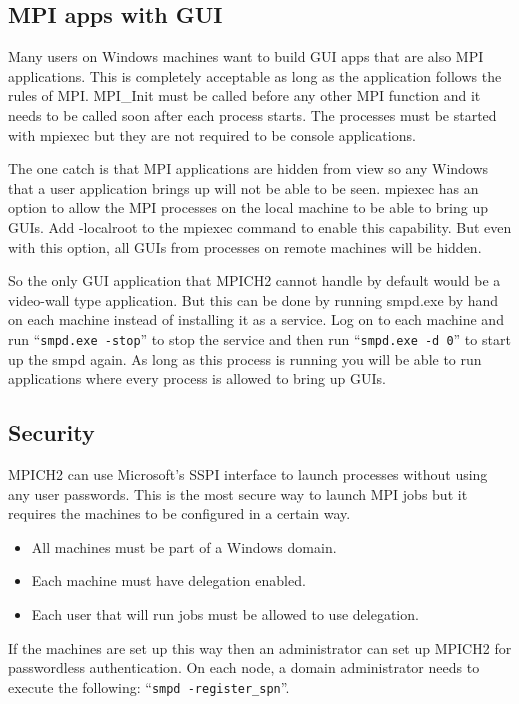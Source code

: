 \documentclass[dvipdfm,11pt]{article}
\begin{document}
\subsection{MPI apps with GUI}
Many users on Windows machines want to build GUI apps that are also MPI applications.  This is
completely acceptable as long as the application follows the rules of MPI.  MPI\_Init must be
called before any other MPI function and it needs to be called soon after each process starts.
The processes must be started with mpiexec but they are not required to be console applications.

The one catch is that MPI applications are hidden from view so any Windows that a user 
application brings up will not be able to be seen.  mpiexec has an option to allow the MPI 
processes on the local machine to be able to bring up GUIs.  Add -localroot to the mpiexec
command to enable this capability.  But even with this option, all GUIs from processes on 
remote machines will be hidden.

So the only GUI application that MPICH2 cannot handle by default would be a video-wall type
application.  But this can be done by running smpd.exe by hand on each machine instead of
installing it as a service.  Log on to each machine and run ``\texttt{smpd.exe -stop}'' 
to stop the service and then run ``\texttt{smpd.exe -d 0}'' to start up the smpd again.  
As long as this process is running you will be able to run applications where every process 
is allowed to bring up GUIs.

\subsection{Security}
MPICH2 can use Microsoft's SSPI interface to launch processes without using any user 
passwords.  This is the most secure way to launch MPI jobs but it requires the machines to be 
configured in a certain way.
\begin{itemize}
\item All machines must be part of a Windows domain.
\item Each machine must have delegation enabled.
\item Each user that will run jobs must be allowed to use delegation.
\end{itemize}

If the machines are set up this way then an administrator can set up MPICH2 for passwordless
authentication.  On each node, a domain administrator needs to execute the following:
``\texttt{smpd -register\_spn}''.
\end{document}
